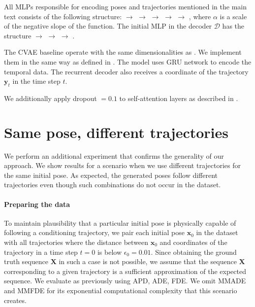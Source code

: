 \documentclass[main.tex]{subfiles}
\begin{document}
All MLPs responsible for encoding poses and trajectories mentioned in the main text consists of the following structure:  $\rightarrow$  $\rightarrow$  $\rightarrow$  $\rightarrow$  $\rightarrow$ , where $\alpha$ is a scale of the negative slope of the function. The initial MLP in the decoder $\mathcal{D}$  has the structure  $\rightarrow$  $\rightarrow$  $\rightarrow$ .

The CVAE baseline operate with the same dimensionalities as \trajevae{}. We implement them in the same way as defined in \cite{yuan2020dlow}. The model uses GRU network to encode the temporal data. The recurrent decoder also receives a coordinate of the trajectory $\mathbf{y}_t$ in the time step $t$. 

We additionally apply dropout $=0.1$ to self-attention layers as described in \cite{vaswani2017attention}.


\section{Same pose, different trajectories}
We perform an additional experiment that confirms the generality of our approach.  We show results for a scenario when we use different trajectories for the same initial pose. As expected, the generated poses follow different trajectories even though such combinations do not occur in the dataset.

\paragraph{Preparing the data}
To maintain plausibility that a particular initial pose is physically capable of following a conditioning trajectory, we pair each initial pose $\mathbf{x}_0$ in the dataset with all trajectories where the distance between $\mathbf{x}_0$ and coordinates of the trajectory in a time step $t= 0$ is below $\epsilon_0 = 0.01$. Since obtaining the ground truth sequence $\mathbf{X}$ in such a case is not possible, we assume that the sequence $\mathbf{X}$ corresponding to a given trajectory is a sufficient approximation of the expected sequence. We evaluate \trajevae{} as previously using APD, ADE, FDE. We omit MMADE and MMFDE for its exponential computational complexity that this scenario creates.
\end{document}
